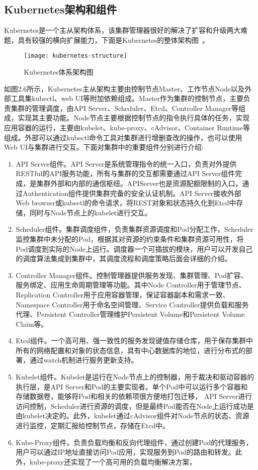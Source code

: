 \subsection{Kubernetes架构和组件}
Kubernetes是一个主从架构体系，该集群管理器很好的解决了扩容和升级两大难题，具有较强的横向扩展能力，下面是Kubernetes的整体架构图~\cite{KUBdoc}。
\begin{figure}[H] %
	\centering
	\texttt{[image: kubernetes-structure]}
	\caption{Kubernetes体系架构图}
\end{figure}
如图2.6所示，Kubernetes主从架构主要由控制节点Master、工作节点Node以及外部工具集kubectl、web UI等附加依赖组成。Master作为集群的控制节点，主要负责集群的管理调度，由API Server、Scheduler、Etcd、Controller Manager等组成，实现其主要功能。Node节点主要根据控制节点的指令执行具体的任务，实现应用容器的运行，主要由kubelet、kube-proxy、cAdvisor、Container Runtime等组成。外部可以通过kubectl命令工具对集群进行增删查改的操作，也可以使用Web UI与集群进行交互。下面对集群中的重要组件分别进行介绍:
\begin{enumerate}[1.]
	\item  API Server组件。API Server是系统管理指令的统一入口，负责对外提供RESTful的API服务功能，所有与集群的交互都需要通过API Server组件完成，是集群外部和内部的通信枢纽。APIServer也是资源配额限制的入口，通过Authentication组件提供集群完备的安全认证机制。API Server接收外部Web browser或kubectl的命令请求，将REST对象和状态持久化到Etcd中存储，同时与Node节点上的kubelet进行交互。
	\item Scheduler组件。集群调度组件，负责集群资源调度和Pod分配工作，Scheduler监控集群中未分配的Pod，根据其对资源的约束条件和集群资源可用性，将Pod调度到实际的Node上运行。调度器一个可插拔的模块，用户可以开发自己的调度算法集成到集群中，其调度流程和调度策略后面会详细的介绍。
	\item Controller Manager组件。控制管理器提供服务发现、集群管理、Pod扩容、服务绑定、应用生命周期管理等功能。其中Node Controller用于管理节点、Replication Controller用于应用容器管理，保证容器副本和需求一致、Namespace Controller用于命名空间管理、Service Controller提供负载和服务代理、Persistent Controller管理维护Persistent Volume和Persistent Volume Claim等。
	\item Etcd组件。一个高可用、强一致性的服务发现键值存储仓库，用于保存集群中所有的网络配置和对象的状态信息，具有中心数据库的地位，进行分布式的部署，通过watch机制进行服务更新支持。
	\item Kubelet组件。Kubelet是运行在Node节点上的控制器，用于裁决和驱动容器的执行层，是API Server和Pod的主要实现者。单个Pod中可以运行多个容器和存储数据卷，能够将Pod和相关的依赖项很方便地打包迁移，	API Server进行访问控制，Scheduler进行资源的调度，但是最终Pod能否在Node上运行成功是由kubelet决定的。此外，kubelet通过cAdvisor组件对Node节点的状态、资源进行监控，定期汇报给控制节点，存储在Etcd中。
	\item Kube-Proxy组件。负责负载均衡和反向代理组件，通过创建Pod的代理服务，用户可以通过IP地址直接访问Pod应用，实现服务到Pod的路由和转发。此外，kube-proxy还实现了一个高可用的负载均衡解决方案，
\end{enumerate}

